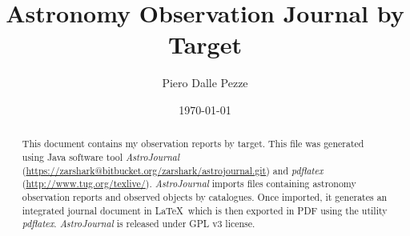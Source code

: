 \documentclass[10pt,twoside,a4paper,english]{article}
\title{Astronomy Observation Journal by Target}
\author{Piero Dalle Pezze}
\date{\today}
\begin{document}
\maketitle
\thispagestyle{empty}

\begin{abstract}
This document contains my observation reports by target. This file was generated using Java software tool {\it AstroJournal} (\href{https://zarshark@bitbucket.org/zarshark/astrojournal.git}{https://zarshark@bitbucket.org/zarshark/astrojournal.git}) and {\it pdflatex} (\href{http://www.tug.org/texlive/}{http://www.tug.org/texlive/}). {\it AstroJournal} imports files containing astronomy observation reports and observed objects by catalogues. Once imported, it generates an integrated journal document in \LaTeX\ which is then exported in PDF using the utility {\it pdflatex}. {\it AstroJournal} is released under GPL v3 license.
\end{abstract}

\tableofcontents


\clearpage


\small

\clearpage


\normalsize
\end{document}
